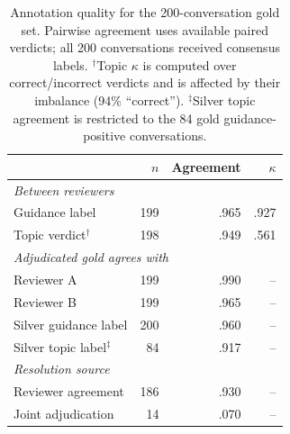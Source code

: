 \begin{table}[t]
\centering
\footnotesize
\setlength{\tabcolsep}{5pt}
\begin{tabular}{lrrr}
\toprule
& $n$ & Agreement & $\kappa$ \\
\midrule
\multicolumn{4}{l}{\textit{Between reviewers}} \\
\quad Guidance label & 199 & .965 & .927 \\
\quad Topic verdict$^{\dagger}$ & 198 & .949 & .561 \\
\midrule
\multicolumn{4}{l}{\textit{Adjudicated gold agrees with}} \\
\quad Reviewer A & 199 & .990 & -- \\
\quad Reviewer B & 199 & .965 & -- \\
\quad Silver guidance label & 200 & .960 & -- \\
\quad Silver topic label$^{\ddagger}$ & 84 & .917 & -- \\
\midrule
\multicolumn{4}{l}{\textit{Resolution source}} \\
\quad Reviewer agreement & 186 & .930 & -- \\
\quad Joint adjudication & 14 & .070 & -- \\
\bottomrule
\end{tabular}
\caption{Annotation quality for the 200-conversation gold set. Pairwise agreement uses available paired verdicts; all 200 conversations received consensus labels. $^{\dagger}$Topic $\kappa$ is computed over correct/incorrect verdicts and is affected by their imbalance (94\% ``correct''). $^{\ddagger}$Silver topic agreement is restricted to the 84 gold guidance-positive conversations.}
\label{tab:gold-annotation}
\end{table}

